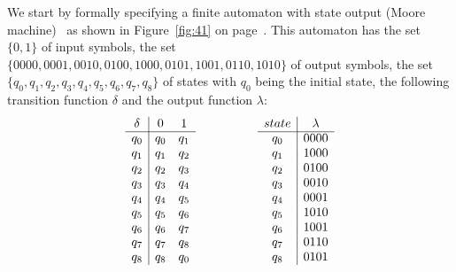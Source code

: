 We start by formally specifying a finite automaton with state output (Moore machine)~\cite{moore1956gedanken} as shown in Figure~\ref{fig:41} on page~\pageref{fig:41}. This automaton has the set $\{0,1\}$ of input symbols, the set $\{0000,0001,0010,0100,1000,0101,1001,0110,1010\}$ of output symbols, the set $\{q_0,q_1,q_2,q_3,q_4,q_5,q_6,q_7,q_8\}$ of states with $q_0$ being the initial state, the following transition function $\delta$ and the output function $\lambda$:
\[
\begin{array}{c|cccc|c}
\delta & 0 & 1 &\quad\quad\quad\quad& state & \lambda\\ 
\cline{0-2}  \cline{5-6}
q_0 & q_0 & q_1 &\quad\quad\quad\quad& q_0 &0000\\
q_1 & q_1 & q_2 &\quad\quad\quad\quad& q_1 &1000\\
q_2 & q_2 & q_3 &\quad\quad\quad\quad& q_2 &0100\\
q_3 & q_3 & q_4 &\quad\quad\quad\quad& q_3 &0010 \\
q_4 & q_4 & q_5 &\quad\quad\quad\quad& q_4 &0001 \\
q_5 & q_5 & q_6 &\quad\quad\quad\quad& q_5 &1010\\
q_6 & q_6 & q_7 &\quad\quad\quad\quad&q_6 & 1001 \\
q_7 & q_7 & q_8 &\quad\quad\quad\quad& q_7 &0110\\
q_8 & q_8 & q_0 &\quad\quad\quad\quad&q_8 & 0101
\end{array} 
\]

